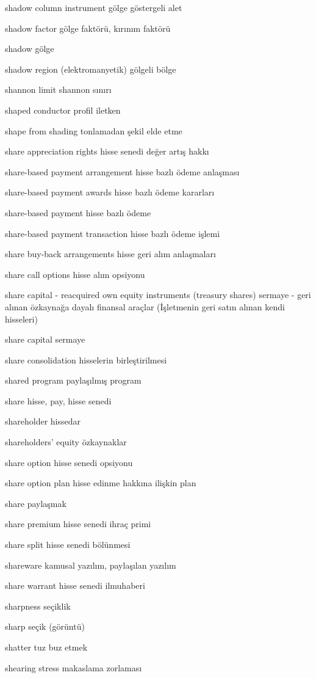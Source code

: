 \documentclass[12pt,fleqn]{article}\usepackage{../../common}
\begin{document}
shadow column instrument gölge göstergeli alet

shadow factor gölge faktörü, kırınım faktörü

shadow gölge

shadow region (elektromanyetik) gölgeli bölge

shannon limit shannon sınırı

shaped conductor profil iletken

shape from shading tonlamadan şekil elde etme

share appreciation rights hisse senedi değer artış hakkı

share-based payment arrangement hisse bazlı ödeme anlaşması

share-based payment awards hisse bazlı ödeme kararları

share-based payment hisse bazlı ödeme

share-based payment transaction hisse bazlı ödeme işlemi

share buy-back arrangements hisse geri alım anlaşmaları

share call options hisse alım opsiyonu

share capital - reacquired own equity instruments (treasury shares) sermaye - geri alınan özkaynağa dayalı finansal araçlar (İşletmenin geri satın alınan kendi hisseleri)

share capital sermaye

share consolidation hisselerin birleştirilmesi

shared program paylaşılmış program

share hisse, pay, hisse senedi

shareholder hissedar

shareholders' equity özkaynaklar

share option hisse senedi opsiyonu

share option plan hisse edinme hakkına ilişkin plan

share paylaşmak

share premium hisse senedi ihraç primi

share split hisse senedi bölünmesi

shareware kamusal yazılım, paylaşılan yazılım

share warrant hisse senedi ilmuhaberi

sharpness seçiklik

sharp seçik (görüntü)

shatter tuz buz etmek

shearing stress makaslama zorlaması
\end{document}
